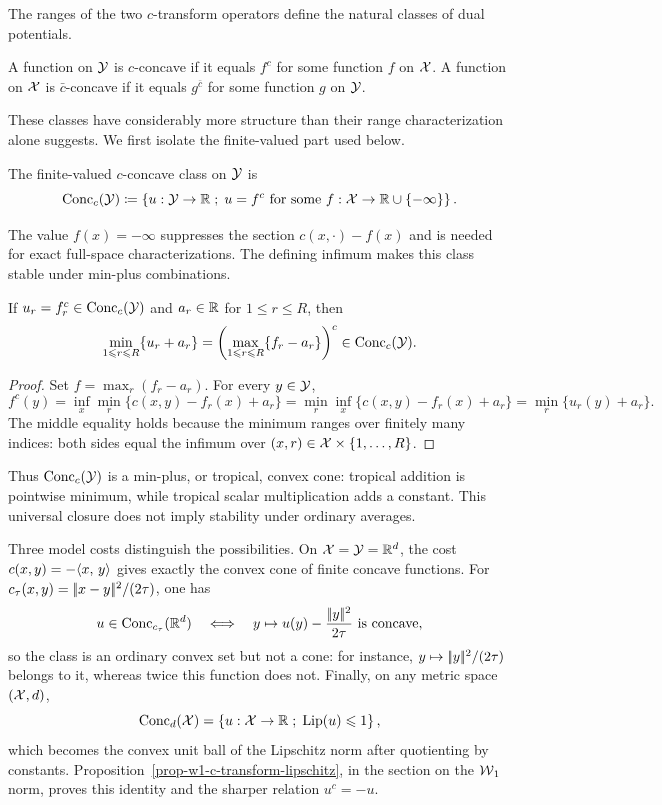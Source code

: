 The ranges of the two $c$-transform operators define the natural classes of dual potentials.
\begin{defn}\label{def-c-concave-functions}
	A function on $\mathcal{Y}$ is $c$-concave if it equals $f^c$ for some function $f$ on $\mathcal{X}$. A function on $\mathcal{X}$ is $\bar c$-concave if it equals $g^{\bar c}$ for some function $g$ on $\mathcal{Y}$.
\end{defn}
These classes have considerably more structure than their range characterization alone suggests. We first isolate the finite-valued part used below.
\begin{defn}\label{def-finite-c-concave-class}
	The finite-valued $c$-concave class on $\mathcal{Y}$ is
	\[
	\operatorname{Conc}_c(\mathcal{Y})
	\coloneqq
	\left\{ u:\mathcal{Y}\to\mathbb{R} \;;\; u=f^c\text{ for some }f:\mathcal{X}\to\mathbb{R}\cup\{-\infty\} \right\}.
	\]
\end{defn}
The value $f(x)=-\infty$ suppresses the section $c(x,\cdot)-f(x)$ and is needed for exact full-space characterizations.
The defining infimum makes this class stable under min-plus combinations.
\begin{prop}\label{prop-c-concave-tropical-barycenter}
	If $u_r=f_r^c\in\operatorname{Conc}_c(\mathcal{Y})$ and $a_r\in\mathbb{R}$ for $1\leq r\leq R$, then
	\[
		\min_{1\leqslant r\leqslant R}\{u_r+a_r\}
		=
		\left(\max_{1\leqslant r\leqslant R}\{f_r-a_r\}\right)^c
		\in\operatorname{Conc}_c(\mathcal{Y}).
	\]
\end{prop}
\begin{proof}
	Set $f=\max_r(f_r-a_r)$. For every $y\in\mathcal{Y}$,
	\[
		f^c(y)
		=
		\inf_x\min_r\{c(x,y)-f_r(x)+a_r\}
		=
		\min_r\inf_x\{c(x,y)-f_r(x)+a_r\}
		=
		\min_r\{u_r(y)+a_r\}.
	\]
	The middle equality holds because the minimum ranges over finitely many indices: both sides equal the infimum over $(x,r)\in\mathcal{X}\times\{1,\ldots,R\}$.
\end{proof}
Thus $\operatorname{Conc}_c(\mathcal{Y})$ is a min-plus, or tropical, convex cone: tropical addition is pointwise minimum, while tropical scalar multiplication adds a constant. This universal closure does not imply stability under ordinary averages.

Three model costs distinguish the possibilities. On $\mathcal{X}=\mathcal{Y}=\mathbb{R}^d$, the cost $c(x,y)=-\langle x,\,y\rangle$ gives exactly the convex cone of finite concave functions. For
$c_\tau(x,y)=|\!| x-y |\!|^2/(2\tau)$, one has
\[
	u\in\operatorname{Conc}_{c_\tau}(\mathbb{R}^d)
	\quad\Longleftrightarrow\quad
	y\mapsto u(y)-\frac{|\!| y |\!|^2}{2\tau}\text{ is concave},
\]
so the class is an ordinary convex set but not a cone: for instance, $y\mapsto|\!| y |\!|^2/(2\tau)$ belongs to it, whereas twice this function does not. Finally, on any metric space $(\mathcal{X},d)$,
\[
	\operatorname{Conc}_d(\mathcal{X})=\left\{ u:\mathcal{X}\to\mathbb{R} \;;\; \operatorname{Lip}(u)\leqslant1 \right\},
\]
which becomes the convex unit ball of the Lipschitz norm after quotienting by constants. Proposition~\ref{prop-w1-c-transform-lipschitz}, in the section on the $\operatorname{\mathcal{W}}_1$ norm, proves this identity and the sharper relation $u^c=-u$.


